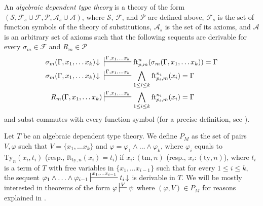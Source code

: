 \documentclass[reqno]{amsart}
\theoremstyle{definition}
\theoremstyle{remark}
\newcommand{\fs}[1]{\mathrm{#1}}
\newcommand{\subst}{\fs{subst}}
\newcommand{\ft}{\fs{ft}}
\newcommand{\ty}{\fs{ty}}
\newcommand{\Ty}{\fs{Ty}}
\newcommand{\tm}{\fs{tm}}
\numberwithin{figure}{section}
\begin{document}
\begin{defn}[alg-tt]
An \emph{algebraic dependent type theory} is a theory of the form $(\mathcal{S}, \mathcal{F}_s \cup \mathcal{F}, \mathcal{P}, \mathcal{A}_s \cup \mathcal{A})$, where $\mathcal{S}$, $\mathcal{F}$, and $\mathcal{P}$ are defined above,
$\mathcal{F}_s$ is the set of function symbols of the theory of substitutions, $\mathcal{A}_s$ is the set of its axioms, and $\mathcal{A}$ is an arbitrary set of axioms such that the following sequents are derivable for every $\sigma_m \in \mathcal{F}$ and $R_m \in \mathcal{P}$
\begin{align*}
\sigma_m(\Gamma, x_1, \ldots x_k)\!\downarrow\ & \sststile{}{\Gamma, x_1, \ldots x_k} \ft^n_{p,m}(\sigma_m(\Gamma, x_1, \ldots x_k)) = \Gamma \\
\sigma_m(\Gamma, x_1, \ldots x_k)\!\downarrow\ & \sststile{}{\Gamma, x_1, \ldots x_k} \bigwedge_{1 \leq i \leq k} \ft^{n_i}_{p_i,m}(x_i) = \Gamma \\
R_m(\Gamma, x_1, \ldots x_k) & \sststile{}{\Gamma, x_1, \ldots x_k} \bigwedge_{1 \leq i \leq k} \ft^{n_i}_{p_i,m}(x_i) = \Gamma
\end{align*}
and $\subst$ commutes with every function symbol (for a precise definition, see \cite[Definition~4.5]{alg-tt}).
\end{defn}

Let $T$ be an algebraic dependent type theory.
We define $P_M$ as the set of pairs $V,\varphi$ such that $V = \{ x_1, \ldots x_k \}$ and $\varphi = \varphi_1 \land \ldots \land \varphi_k$, where $\varphi_i$ equals to $\Ty_n(x_i,t_i)$ (resp., $\ft_{\ty,n}(x_i) = t_i$) if $x_i : (\tm,n)$ (resp., $x_i : (\ty,n)$),
where $t_i$ is a term of $T$ with free variables in $\{ x_1, \ldots x_{i-1} \}$ such that for every $1 \leq i \leq k$,
the sequent $\varphi_1 \land \ldots \land \varphi_{i-1} \sststile{}{x_1, \ldots x_{i-1}} t_i\!\downarrow$ is derivable in $T$.
We will be mostly interested in theorems of the form $\varphi \sststile{}{V} \psi$ where $(\varphi,V) \in P_M$ for reasons explained in \cite{morita-equiv}.
\end{document}
